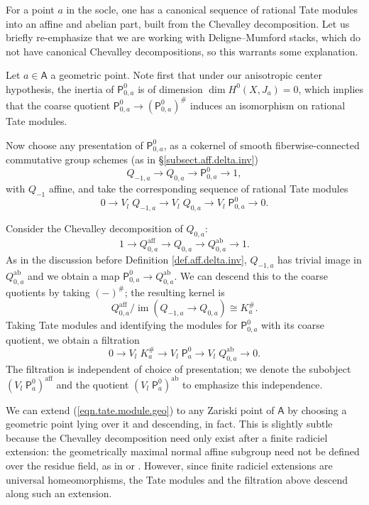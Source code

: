 \documentclass[openany]{amsbook}
\theoremstyle{definition}
\theoremstyle{remark}
\numberwithin{equation}{section}
\newcommand{\im}{\operatorname{im}}
\renewcommand{\-}{\operatorname{-}}
\newcommand{\bA}{\mathsf{A}}
\newcommand{\bP}{\mathsf{P}}
\newcommand{\aff}{\mathrm{aff}}
\newcommand{\ab}{\mathrm{ab}}
\newcommand{\Tate}{V_l \;}
\begin{document}
For a point $a$ in the socle, one has a canonical sequence of rational Tate modules into an affine and abelian part, built from the Chevalley decomposition. Let us briefly re-emphasize that we are working with Deligne--Mumford stacks, which do not have canonical Chevalley decompositions, so this warrants some explanation. 

Let $a \in \bA$ a geometric point. Note first that under our anisotropic center hypothesis, the inertia of $\bP_{0,a}^0$ is of dimension $\dim H^0(X, J_a) = 0$, which implies that the coarse quotient $\bP_{0,a}^0 \to (\bP_{0,a}^0)^\#$ induces an isomorphism on rational Tate modules.

Now choose any presentation of $\bP_{0,a}^0$, as a cokernel of smooth fiberwise-connected commutative group schemes (as in \S \ref{subsect.aff.delta.inv})
$$
    Q_{-1,a} \to Q_{0,a} \to \bP_{0,a}^0 \to 1,
$$
with $Q_{-1}$ affine, and take the corresponding sequence of rational Tate modules
$$
    0 \to \Tate Q_{-1, a} \to \Tate Q_{0, a} \to \Tate \bP_{0,a}^0 \to 0.
$$

Consider the Chevalley decomposition of $Q_{0,a}$:
$$
    1 \to Q_{0, a}^{\aff} \to Q_{0, a} \to Q^{\ab}_{0, a} \to 1.
$$
As in the discussion before Definition \ref{def.aff.delta.inv}, $Q_{-1,a}$ has trivial image in $Q_{0, a}^{\ab}$ and we obtain a map $\bP_{0,a}^0 \to Q_{0, a}^{\ab}$. We can descend this to the coarse quotients by taking $(-)^{\#}$; the resulting kernel is $$Q_{0,a}^{\aff}/\im(Q_{-1,a} \to Q_{0,a}) \cong K_a^\#.$$ 
Taking Tate modules and identifying the modules for $\bP_{0,a}^0$ with its coarse quotient, we obtain a filtration
\begin{equation}\label{eqn.tate.module.geo}
    0 \to \Tate K_a^\# \to \Tate \bP_{a}^0 \to \Tate Q_{0, a}^{\ab} \to 0.
\end{equation}
The filtration is independent of choice of presentation; we denote the subobject $(\Tate \bP_{a}^0)^{\aff}$ and the quotient $(\Tate \bP_{a}^0)^{\ab}$ to emphasize this independence.

We can extend (\ref{eqn.tate.module.geo}) to any Zariski point of $\bA$ by choosing a geometric point lying over it and descending, in fact. This is slightly subtle because the Chevalley decomposition need only exist after a finite radiciel extension: the geometrically maximal normal affine subgroup need not be defined over the residue field, as in \cite{pseudoabvars} or \cite[Exp.\ XVII, App.\ III, Cor.\ to Prop.\ C.5.1]{SGAIII}. However, since finite radiciel extensions are universal homeomorphisms, the Tate modules and the filtration above descend along such an extension.
\end{document}
